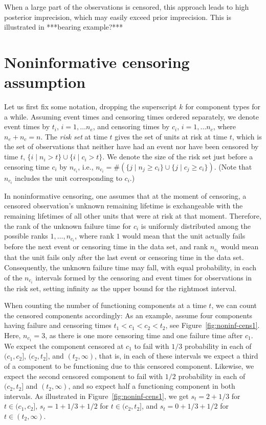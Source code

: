 \documentclass[12pt, a4paper]{elsarticle}
\begin{document}
When a large part of the observations is censored,
this approach leads to high posterior imprecision,
which may easily exceed prior imprecision.
This is illustrated in ***bearing example?***


\section{Noninformative censoring assumption}

Let us first fix some notation, dropping the superscript $k$ for component types for a while.
Assuming event times and censoring times ordered separately,
we denote event times by $t_i$, $i=1, \ldots n_e$,
and censoring times by $c_i$, $i=1, \ldots n_c$,
where $n_e + n_c = n$.
The \emph{risk set} at time $t$ gives the set of units at risk at time $t$,
which is the set of observations that neither have had an event nor have been censored by time $t$,
$\{ i \mid n_i > t \} \cup \{ i \mid c_i > t \}$.
We denote the size of the risk set just before a censoring time $c_i$ by $n_{c_i}$,
i.e., $n_{c_i} = \#(\{ j \mid n_j \ge c_i \} \cup \{ j \mid c_j \ge c_i \})$.
(Note that $n_{c_i}$ includes the unit corresponding to $c_i$.)

In noninformative censoring, one assumes that
at the moment of censoring, a censored observation's unknown remaining lifetime
is exchangeable with the remaining lifetimes of all other units that were at risk at that moment. %
Therefore, the rank of the unknown failure time for $c_i$ is uniformly distributed among the possible ranks $1, \ldots, n_{c_i}$,
where rank $1$ would mean that the unit actually fails before the next event or censoring time in the data set,
and rank $n_{c_i}$ would mean that the unit fails only after the last event or censoring time in the data set.
Consequently, the unknown failure time may fall, with equal probability,
in each of the $n_{c_i}$ intervals formed by the censoring and event times for observations in the risk set,
setting infinity as the upper bound for the rightmost interval.

When counting the number of functioning components at a time $t$,
we can count the censored components accordingly:
As an example, assume four components having failure and censoring times $t_1 < c_1 < c_2 < t_2$,
see Figure~\ref{fig:noninf-cens1}.
Here, $n_{c_1} = 3$, as there is one more censoring time and one failure time after $c_1$.
We expect the component censored at $c_1$ to fail with $1/3$ probability in each of
$(c_1, c_2]$, $(c_2, t_2]$, and $(t_2, \infty)$,
that is, in each of these intervals we expect a third of a component to be functioning
due to this censored component.
Likewise, we expect the second censored component to fail with $1/2$ probability
in each of $(c_2, t_2]$ and $(t_2, \infty)$,
and so expect half a functioning component in both intervals.
%
As illustrated in Figure~\ref{fig:noninf-cens1},
we get $s_t = 2 + 1/3$ for $t \in (c_1, c_2]$,
$s_t = 1 + 1/3 + 1/2$ for $t \in (c_2, t_2]$,
and $s_t = 0 + 1/3 + 1/2$ for $t \in (t_2, \infty)$.
\end{document}
